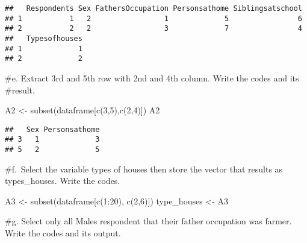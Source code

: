 \documentclass[
]{article}
\newenvironment{Shaded}{\begin{snugshade}}{\end{snugshade}}
\newcommand{\DecValTok}[1]{\textcolor[rgb]{0.00,0.00,0.81}{#1}}
\newcommand{\FunctionTok}[1]{\textcolor[rgb]{0.00,0.00,0.00}{#1}}
\newcommand{\NormalTok}[1]{#1}
\newcommand{\OtherTok}[1]{\textcolor[rgb]{0.56,0.35,0.01}{#1}}
\newcommand{\SpecialCharTok}[1]{\textcolor[rgb]{0.00,0.00,0.00}{#1}}
\newcommand{\StringTok}[1]{\textcolor[rgb]{0.31,0.60,0.02}{#1}}
\begin{document}
\begin{verbatim}
##   Respondents Sex FathersOccupation Personsathome Siblingsatschool
## 1           1   2                 1             5                6
## 2           2   2                 3             7                4
##   Typesofhouses
## 1             1
## 2             2
\end{verbatim}

\#e. Extract 3rd and 5th row with 2nd and 4th column. Write the codes
and its \#result.

\begin{Shaded}
\begin{Highlighting}[]
\NormalTok{A2 }\OtherTok{\textless{}{-}} \FunctionTok{subset}\NormalTok{(dataframe[}\FunctionTok{c}\NormalTok{(}\DecValTok{3}\NormalTok{,}\DecValTok{5}\NormalTok{),}\FunctionTok{c}\NormalTok{(}\DecValTok{2}\NormalTok{,}\DecValTok{4}\NormalTok{)])}
\NormalTok{A2}
\end{Highlighting}
\end{Shaded}

\begin{verbatim}
##   Sex Personsathome
## 3   1             3
## 5   2             5
\end{verbatim}

\#f.~Select the variable types of houses then store the vector that
results as types\_houses. Write the codes.

\begin{Shaded}
\begin{Highlighting}[]
\NormalTok{A3 }\OtherTok{\textless{}{-}} \FunctionTok{subset}\NormalTok{(dataframe[}\FunctionTok{c}\NormalTok{(}\DecValTok{1}\SpecialCharTok{:}\DecValTok{20}\NormalTok{), }\FunctionTok{c}\NormalTok{(}\DecValTok{2}\NormalTok{,}\DecValTok{6}\NormalTok{)])}
\NormalTok{type\_houses }\OtherTok{\textless{}{-}}\NormalTok{ A3}
\end{Highlighting}
\end{Shaded}

\#g. Select only all Males respondent that their father occupation was
farmer. Write the codes and its output.

\begin{Shaded}
\end{Shaded}
\end{document}
